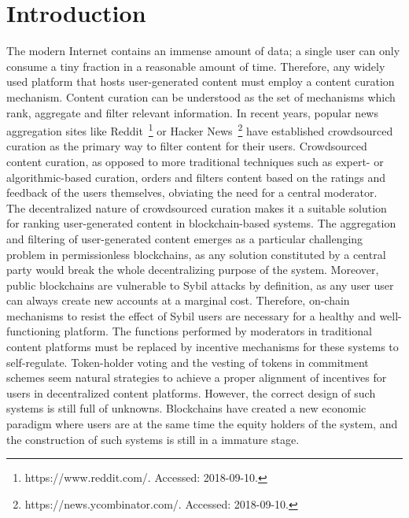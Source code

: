 \section{Introduction}
    
  The modern Internet contains an immense amount of data; a single user can only consume a tiny fraction in a reasonable amount of time. Therefore, any widely used platform that hosts user-generated content must employ a content curation mechanism. Content curation can be understood as the set of mechanisms which rank, aggregate and filter relevant information. In recent years, popular news aggregation sites like Reddit~\footnote{https://www.reddit.com/. Accessed: 2018-09-10.} or Hacker News~\footnote{https://news.ycombinator.com/. Accessed: 2018-09-10.} have established crowdsourced curation as the primary way to filter content for their users. Crowdsourced content curation, as opposed to more traditional techniques such as expert- or algorithmic-based curation, orders and filters content based on the ratings and feedback of the users themselves, obviating the need for a central moderator.\\
  
  The decentralized nature of crowdsourced curation makes it a suitable solution for ranking user-generated content in blockchain-based systems. The aggregation and filtering of user-generated content emerges as a particular challenging problem in permissionless blockchains, as any solution constituted by a central party would break the whole decentralizing purpose of the system. Moreover, public blockchains are vulnerable to Sybil attacks by definition, as any user user can always create new accounts at a marginal cost. Therefore, on-chain mechanisms to resist the effect of Sybil users are necessary for a healthy and well-functioning platform. The functions performed by moderators in traditional content platforms must be replaced by incentive mechanisms for these systems to self-regulate. Token-holder voting and the vesting of tokens in commitment schemes seem natural strategies to achieve a proper alignment of incentives for users in decentralized content platforms. However, the correct design of such systems is still full of unknowns. Blockchains have created a new economic paradigm where users are at the same time the equity holders of the system, and the construction of such systems is still in a immature stage.\\
  
